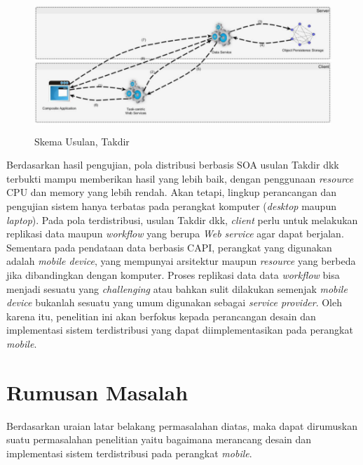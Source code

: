 \begin{figure}
    \centering
    \includegraphics[height=5cm]{images/Takdir-Distributed-SOA}
    \caption{Skema Usulan, Takdir}
    \label{fig:takdir-soa}
\end{figure}

Berdasarkan hasil pengujian, pola distribusi berbasis SOA usulan Takdir dkk terbukti mampu memberikan hasil yang lebih baik, dengan penggunaan \textit{resource} CPU dan memory yang lebih rendah. Akan tetapi, lingkup perancangan dan pengujian sistem hanya terbatas pada perangkat komputer (\textit{desktop} maupun \textit{laptop}). Pada pola terdistribusi, usulan Takdir dkk, \textit{client} perlu untuk melakukan replikasi data maupun \textit{workflow} yang berupa \textit{Web service} agar dapat berjalan. Sementara pada pendataan data berbasis CAPI, perangkat yang digunakan adalah \textit{mobile device}, yang mempunyai arsitektur maupun \textit{resource} yang berbeda jika dibandingkan dengan komputer. Proses replikasi data data \textit{workflow} bisa menjadi sesuatu yang \textit{challenging} atau bahkan sulit dilakukan semenjak \textit{mobile device} bukanlah sesuatu yang umum digunakan sebagai \textit{service provider}.	Oleh karena itu, penelitian ini akan berfokus kepada perancangan desain dan implementasi sistem terdistribusi yang  dapat diimplementasikan pada perangkat \textit{mobile}.

\section{Rumusan Masalah}
Berdasarkan uraian latar belakang permasalahan diatas, maka dapat dirumuskan suatu permasalahan penelitian yaitu bagaimana merancang desain dan implementasi sistem terdistribusi pada perangkat \textit{mobile}.

